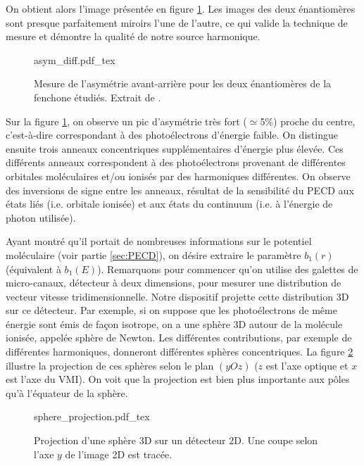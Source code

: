 On obtient alors l'image présentée en figure \ref{fig:asym_diff}. Les images des deux énantiomères sont presque parfaitement miroirs l'une de l'autre, ce qui valide la technique de mesure et démontre la qualité de notre source harmonique. 

\begin{figure}[!ht]
\centering
\def\svgwidth{0.8\columnwidth}
{asym_diff.pdf_tex}
\caption{Mesure de l'asymétrie avant-arrière pour les deux énantiomères de la fenchone étudiés. Extrait de .}
\label{fig:asym_diff}
\end{figure}

Sur la figure \ref{fig:asym_diff}, on observe un pic d'asymétrie très fort ($\simeq$5\%) proche du centre, c'est-à-dire correspondant à des photoélectrons d'énergie faible. On distingue ensuite trois anneaux concentriques supplémentaires d'énergie plus élevée. Ces différents anneaux correspondent à des photoélectrons provenant de différentes orbitales moléculaires et/ou ionisés par des harmoniques différentes. On observe des inversions de signe entre les anneaux, résultat de la sensibilité du PECD aux états liés (i.e. orbitale ionisée) et aux états du continuum (i.e. à l'énergie de photon utilisée). 

Ayant montré qu'il portait de nombreuses informations sur le potentiel moléculaire (voir partie \ref{sec:PECD}), on désire extraire le paramètre $b_1(r)$ (équivalent à $b_1(E)$). Remarquons pour commencer qu'on utilise des galettes de micro-canaux, détecteur à deux dimensions, pour mesurer une distribution de vecteur vitesse tridimensionnelle. Notre dispositif projette cette distribution 3D sur ce détecteur. Par exemple, si on suppose que les photoélectrons de même énergie sont émis de façon isotrope, on a une sphère 3D autour de la molécule ionisée, appelée sphère de Newton. Les différentes contributions, par exemple de différentes harmoniques, donneront différentes sphères concentriques. La figure \ref{fig:sphere_projection} illustre la projection de ces sphères selon le plan $(yOz)$ ($z$ est l'axe optique et $x$ est l'axe du VMI). On voit que la projection est bien plus importante aux pôles qu'à l'équateur de la sphère. 

\begin{figure}[!ht]
\centering
\def\svgwidth{0.5\columnwidth}
{sphere_projection.pdf_tex}
\caption{Projection d'une sphère 3D sur un détecteur 2D. Une coupe selon l'axe $y$ de l'image 2D est tracée.}
\label{fig:sphere_projection}
\end{figure}

